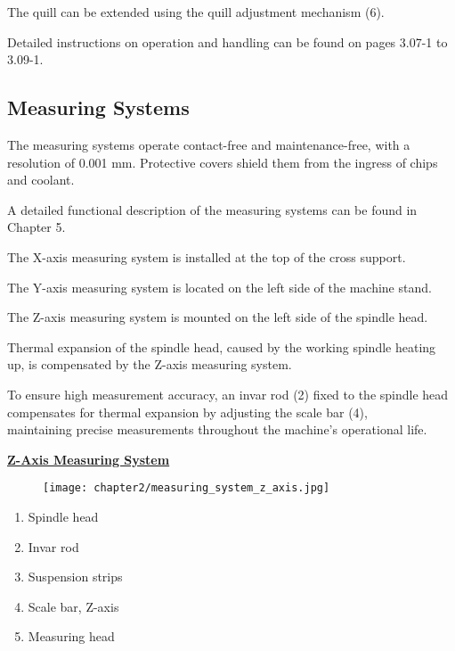 The quill can be extended using the quill adjustment mechanism (6).

Detailed instructions on operation and handling can be found on pages 3.07-1 to 3.09-1.

\newpage
\subsection{Measuring Systems}

The measuring systems operate contact-free and maintenance-free, with a \\resolution of 0.001 mm. Protective covers shield them from the ingress of chips and coolant.

A detailed functional description of the measuring systems can be found in Chapter 5.

The X-axis measuring system is installed at the top of the cross support.

The Y-axis measuring system is located on the left side of the machine stand.

The Z-axis measuring system is mounted on the left side of the spindle head.

Thermal expansion of the spindle head, caused by the working spindle heating up, is compensated by the Z-axis measuring system.

To ensure high measurement accuracy, an invar rod (2) fixed to the spindle head compensates for thermal expansion by adjusting the scale bar (4), \\maintaining precise measurements throughout the machine's operational life.

\vspace{0.5cm}

\textbf{\uline{Z-Axis Measuring System}}

\begin{figure}[h]
    \centering
    \texttt{[image: chapter2/measuring\_system\_z\_axis.jpg]}
    \caption{}
    \label{fig:measuring_system_z}
\end{figure}

\begin{enumerate}[itemsep=1pt,parsep=0pt]
    \item Spindle head
    \item Invar rod
    \item Suspension strips
    \item Scale bar, Z-axis
    \item Measuring head
\end{enumerate}

